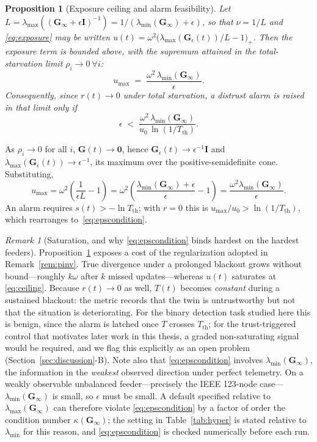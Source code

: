 \documentclass[journal]{IEEEtran}
\theoremstyle{plain}
\newtheorem{proposition}{Proposition}
\theoremstyle{definition}
\theoremstyle{remark}
\newtheorem{remark}{Remark}
\newcommand{\bG}{\mathbf{G}}
\newcommand{\bI}{\mathbf{I}}
\newcommand{\lmax}{\lambda_{\max}}
\newcommand{\lmin}{\lambda_{\min}}
\begin{document}
\begin{proposition}[Exposure ceiling and alarm feasibility]
\label{prop:ceiling}
Let $L=\lmax((\bG_{\infty}+\epsilon\bI)^{-1})=1/(\lmin(\bG_{\infty})+\epsilon)$,
so that $\nu=1/L$ and \eqref{eq:exposure} may be written
$u(t)=\omega^{2}\big(\lmax(\bG_{\epsilon}(t))/L-1\big)_{+}$. Then the
exposure term is bounded above, with the supremum attained in the
total-starvation limit $\rho_i\to0\ \forall i$:
\begin{equation}
u_{\max}\;=\;\frac{\omega^{2}\,\lmin(\bG_{\infty})}{\epsilon}.
\label{eq:ceiling}
\end{equation}
Consequently, since $r(t)\to0$ under total starvation, a distrust alarm is
raised in that limit \emph{only if}
\begin{equation}
\epsilon\;<\;\frac{\omega^{2}\,\lmin(\bG_{\infty})}{u_0\,\ln(1/T_{\mathrm{th}})}.
\label{eq:epscondition}
\end{equation}
\end{proposition}
\begin{IEEEproof}
As $\rho_i\to0$ for all $i$, $\bG(t)\to\mathbf{0}$, hence
$\bG_{\epsilon}(t)\to\epsilon^{-1}\bI$ and
$\lmax(\bG_{\epsilon}(t))\to\epsilon^{-1}$, its maximum over the
positive-semidefinite cone. Substituting,
\[
u_{\max}=\omega^{2}\!\left(\frac{1}{\epsilon L}-1\right)
=\omega^{2}\!\left(\frac{\lmin(\bG_{\infty})+\epsilon}{\epsilon}-1\right)
=\frac{\omega^{2}\lmin(\bG_{\infty})}{\epsilon}.
\]
An alarm requires $s(t)>-\ln T_{\mathrm{th}}$; with $r=0$ this is
$u_{\max}/u_0>\ln(1/T_{\mathrm{th}})$, which rearranges
to~\eqref{eq:epscondition}.
\end{IEEEproof}

\begin{remark}[Saturation, and why \eqref{eq:epscondition} binds hardest on
the hardest feeders]
\label{rem:saturation}
Proposition~\ref{prop:ceiling} exposes a cost of the regularization
adopted in Remark~\ref{rem:pinv}. True divergence under a prolonged
blackout grows without bound---roughly $k\omega$ after $k$ missed
updates---whereas $u(t)$ saturates at \eqref{eq:ceiling}. Because
$r(t)\to0$ as well, $T(t)$ becomes \emph{constant} during a sustained
blackout: the metric records that the twin is untrustworthy but not that
the situation is deteriorating. For the binary detection task studied here
this is benign, since the alarm is latched once $T$ crosses
$T_{\mathrm{th}}$; for the trust-triggered control that motivates later
work in this thesis, a graded non-saturating signal would be required, and
we flag this explicitly as an open problem
(Section~\ref{sec:discussion}-B). Note also that \eqref{eq:epscondition}
involves $\lmin(\bG_{\infty})$, the information in the \emph{weakest}
observed direction under perfect telemetry. On a weakly observable
unbalanced feeder---precisely the IEEE 123-node case---$\lmin(\bG_{\infty})$
is small, so $\epsilon$ must be small. A default specified relative to
$\lmax(\bG_{\infty})$ can therefore violate \eqref{eq:epscondition} by a
factor of order the condition number $\kappa(\bG_{\infty})$; the setting in
Table~\ref{tab:hyper} is stated relative to $\lmin$ for this reason, and
\eqref{eq:epscondition} is checked numerically before each run.
\end{remark}
\end{document}
